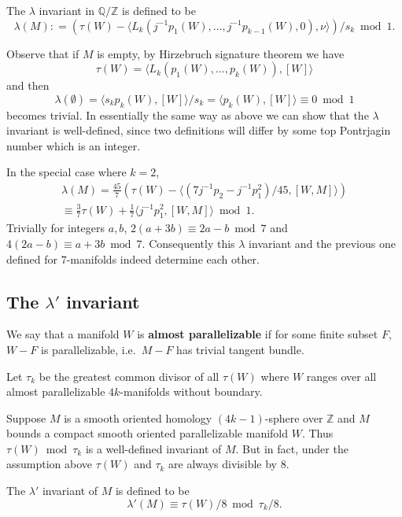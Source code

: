 \documentclass[twoside]{article}
\begin{document}
\begin{define}
	The $\lambda$ invariant in $\mathbb{Q}/\mathbb{Z}$ is defined to be 
	\[
	\lambda(M) \colon  = (\tau(W)-\langle L_k(j^{-1}p_1(W), \dots  ,j^{-1}p_{k-1}(W),0),\nu\rangle)/s_k  \bmod  1. 
	\]
\end{define}

Observe that if $M$ is empty, by Hirzebruch signature theorem we have 
\[
\tau(W) = \langle L_k(p_1(W), \dots  ,p_k(W)),[W]\rangle
\]
and then 
\[
\lambda(\emptyset) = \langle s_kp_k(W),[W]\rangle/s_k = \langle p_k(W),[W]\rangle \equiv  0  \bmod  1
\]
becomes trivial. In essentially the same way as above we can show that the $\lambda$ invariant is well-defined, since two definitions will differ by some top Pontrjagin number which is an integer. 

In the special case where $k = 2$, 
\begin{gather*}
\lambda(M) = \frac{45}{7}({\tau(W)-\langle(7j^{-1}p_2-j^{-1}p_1^2)/45,[W,M]\rangle}) \\
\equiv  \frac{3}{7}\tau(W) + \frac{1}{7}\langle j^{-1}p_1^2,[W,M]\rangle  \bmod  1.  
\end{gather*}
Trivially for integers $a,b$, $2(a + 3b) \equiv 2a-b  \bmod  7$ and $4(2a-b) \equiv  a + 3b \bmod  7$. Consequently this $\lambda$ invariant and the previous one defined for $7$-manifolds indeed determine each other.  


\subsection{The \texorpdfstring{$\lambda'$}{lambda'} invariant}

We say that a manifold $W$ is \textbf{almost parallelizable} if for some finite subset $F$, $W-F$ is parallelizable, i.e.\ $M-F$ has trivial tangent bundle. 

Let $\tau_k$ be the greatest common divisor of all $\tau(W)$ where $W$ ranges over all almost parallelizable $4k$-manifolds without boundary. 

Suppose $M$ is a smooth oriented homology $(4k-1)$-sphere over $\mathbb{Z}$ and $M$ bounds a compact smooth oriented parallelizable manifold $W$. Thus $\tau(W)  \bmod  \tau_k$ is a well-defined invariant of $M$. But in fact, under the assumption above $\tau(W)$ and $\tau_k$ are always divisible by $8$. 

\begin{define}
	The $\lambda'$ invariant of $M$ is defined to be 
	\[
	\lambda'(M) \equiv  \tau(W)/8  \bmod  \tau_k/8. 
	\]
\end{define}
\end{document}
